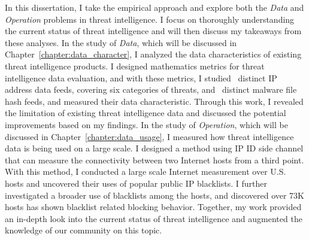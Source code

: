 In this dissertation, I take the empirical approach and explore both the 
\textit{Data} and \textit{Operation} problems in threat intelligence.
I focus on thoroughly understanding the current status of threat 
intelligence and will then discuss my takeaways from these analyses.
In the study of \textit{Data}, which will be discussed in Chapter~\ref{chapter:data_character}, 
I analyzed the data characteristics of existing threat intelligence products.
I designed mathematics metrics for threat intelligence data evaluation,
and with these metrics, I studied \numipfeeds\ distinct IP address 
data feeds, covering six categories of threats, and \numhashfeeds\ distinct
malware file hash feeds, and measured their data characteristic. Through this
work, I revealed the limitation of existing threat intelligence data and 
discussed the potential improvements based on my findings. In the study of
\textit{Operation}, which will be discussed in Chapter~\ref{chapter:data_usage},
I measured how threat intelligence data is being used on a large scale. 
I designed a method using IP ID side channel that can measure the 
connectivity between two Internet hosts from a third point. With this 
method, I conducted a large scale Internet measurement over {} 
U.S. hosts and uncovered their uses of {\blacklistnum} popular public IP
blacklists. I further investigated a broader use of blacklists among the 
hosts, and discovered over 73K hosts has shown blacklist related blocking 
behavior. Together, my work provided an in-depth look into the current
status of threat intelligence and augmented the knowledge of our community
on this topic.

